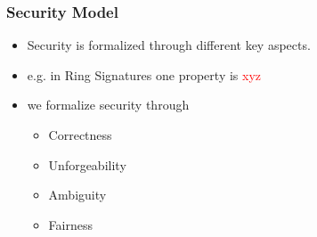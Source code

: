 \begin{frame}
	\frametitle{Security Model}

	\begin{itemize}
		\item Security is formalized through different key aspects.
		\item e.g. in Ring Signatures one property is \textcolor{red}{xyz}
		\item we formalize security through
			\begin{itemize}
				\item Correctness
				\item Unforgeability
				\item Ambiguity
				\item Fairness
			\end{itemize}
	\end{itemize}
\end{frame}